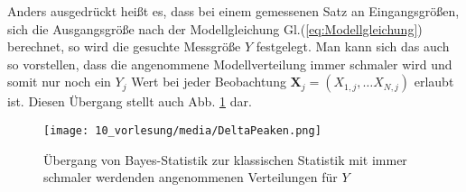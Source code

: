 Anders ausgedrückt heißt es, dass bei einem gemessenen Satz an Eingangsgrößen,
sich die Ausgangsgröße nach der Modellgleichung Gl.(\ref{eq:Modellgleichung}) berechnet,
so wird die gesuchte Messgröße $Y$ festgelegt. Man kann sich das auch so vorstellen, dass
die angenommene Modellverteilung immer schmaler wird und somit nur
noch ein $Y_j$ Wert bei jeder Beobachtung $\boldsymbol{X}_j = (X_{1,j}, \dots X_{N,j})$
erlaubt ist.
Diesen Übergang stellt auch Abb. \ref*{fig:Uebergang_Delta_Funktion} dar.
\begin{figure}[!htp]
	\begin{center}
		\texttt{[image: 10\_vorlesung/media/DeltaPeaken.png]}
		\caption{Übergang von Bayes-Statistik zur klassischen Statistik mit immer schmaler werdenden angenommenen Verteilungen für $Y$}
		\label{fig:Uebergang_Delta_Funktion}
	\end{center}
\end{figure}

